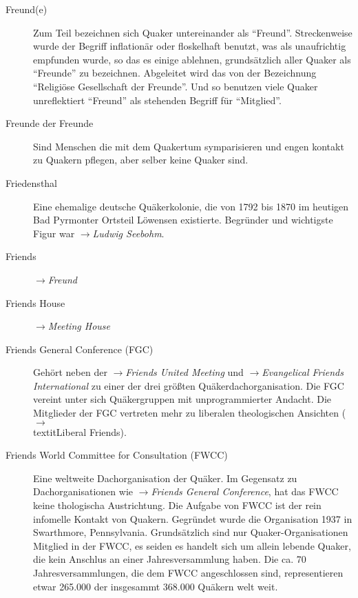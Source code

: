 \begin{description}
 \item[Freund(e)] Zum Teil bezeichnen sich Quaker untereinander als "`Freund"'. Streckenweise wurde der Begriff inflationär oder floskelhaft benutzt, was
 als unaufrichtig empfunden wurde, so das es einige ablehnen, grundsätzlich
 aller Quaker als "`Freunde"' zu bezeichnen. Abgeleitet wird das von der
 Bezeichnung "`Religiöse Gesellschaft der Freunde"'. Und so benutzen viele
 Quaker unreflektiert "`Freund"' als stehenden Begriff für "`Mitglied"'.
 
 \item[Freunde der Freunde] Sind Menschen die mit dem Quakertum symparisieren
 und engen kontakt zu Quakern pflegen, aber selber keine Quaker sind.

 \item[Friedensthal] Eine ehemalige deutsche Quäkerkolonie, die von 1792 bis
 1870 im heutigen Bad Pyrmonter Ortsteil Löwensen existierte. Begründer und
 wichtigste Figur war $\to$\textit{Ludwig Seebohm}.

 \item[Friends] $\to$\textit{Freund}

 \item[Friends House] $\to$\textit{Meeting House}

 \item[Friends General Conference (FGC)] Gehört neben der
 $\to$\textit{Friends United Meeting} und $\to$\textit{Evangelical Friends
 International} zu einer der drei größten Quäkerdachorganisation. Die FGC
 vereint unter sich Quäkergruppen mit unprogrammierter Andacht. Die Mitglieder
 der FGC vertreten mehr zu liberalen theologischen Ansichten
 ($\to$\\textit{Liberal Friends}). 



 \item[Friends World Committee for Consultation (FWCC)] Eine weltweite
 Dachorganisation der Quäker. Im Gegensatz zu Dachorganisationen wie
 $\to$\textit{Friends General Conference}, hat das FWCC keine thologischa
 Austrichtung. Die Aufgabe von FWCC ist der rein infomelle Kontakt von Quakern.
 Gegründet wurde die Organisation 1937 in Swarthmore, Pennsylvania.
 Grundsätzlich sind nur Quaker-Organisationen Mitglied in der FWCC, es seiden
 es handelt sich um allein lebende Quaker, die kein Anschlus an einer
 Jahresversammlung haben. Die ca. 70 Jahresversammlungen, die dem FWCC
 angeschlossen sind, representieren etwar 265.000 der insgesammt 368.000
 Quäkern welt weit.




\end{description}
